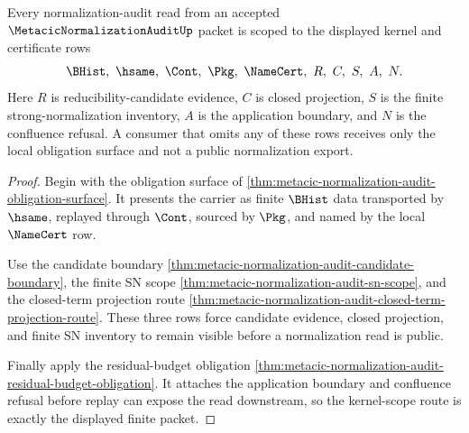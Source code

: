 \begin{theorem}
\label{thm:metacic-normalization-audit-kernel-scope-route}
Every normalization-audit read from an accepted $\MetacicNormalizationAuditUp$ packet is scoped to the displayed kernel and certificate rows
$$
\BHist,\ \hsame,\ \Cont,\ \Pkg,\ \NameCert,\ R,\ C,\ S,\ A,\ N .
$$
Here $R$ is reducibility-candidate evidence, $C$ is closed projection, $S$ is the finite strong-normalization inventory, $A$ is the application boundary, and $N$ is the confluence refusal. A consumer that omits any of these rows receives only the local obligation surface and not a public normalization export.
\end{theorem}
\begin{proof}
Begin with the obligation surface of \autoref{thm:metacic-normalization-audit-obligation-surface}. It presents the carrier as finite $\BHist$ data transported by $\hsame$, replayed through $\Cont$, sourced by $\Pkg$, and named by the local $\NameCert$ row.

Use the candidate boundary \autoref{thm:metacic-normalization-audit-candidate-boundary}, the finite SN scope \autoref{thm:metacic-normalization-audit-sn-scope}, and the closed-term projection route \autoref{thm:metacic-normalization-audit-closed-term-projection-route}. These three rows force candidate evidence, closed projection, and finite SN inventory to remain visible before a normalization read is public.

Finally apply the residual-budget obligation \autoref{thm:metacic-normalization-audit-residual-budget-obligation}. It attaches the application boundary and confluence refusal before replay can expose the read downstream, so the kernel-scope route is exactly the displayed finite packet.
\end{proof}

